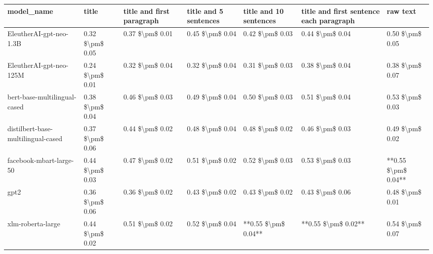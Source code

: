 \begin{tabular}{lllllll}
\toprule
                        model\_name &           title & title and first paragraph & title and 5 sentences & title and 10 sentences & title and first sentence each paragraph &            raw text \\
\midrule
           EleutherAI-gpt-neo-1.3B & 0.32 \$\textbackslash pm\$ 0.05 &           0.37 \$\textbackslash pm\$ 0.01 &       0.45 \$\textbackslash pm\$ 0.04 &        0.42 \$\textbackslash pm\$ 0.03 &                         0.44 \$\textbackslash pm\$ 0.04 &     0.50 \$\textbackslash pm\$ 0.05 \\
           EleutherAI-gpt-neo-125M & 0.24 \$\textbackslash pm\$ 0.01 &           0.32 \$\textbackslash pm\$ 0.04 &       0.32 \$\textbackslash pm\$ 0.04 &        0.31 \$\textbackslash pm\$ 0.03 &                         0.38 \$\textbackslash pm\$ 0.04 &     0.38 \$\textbackslash pm\$ 0.07 \\
      bert-base-multilingual-cased & 0.38 \$\textbackslash pm\$ 0.04 &           0.46 \$\textbackslash pm\$ 0.03 &       0.49 \$\textbackslash pm\$ 0.04 &        0.50 \$\textbackslash pm\$ 0.03 &                         0.51 \$\textbackslash pm\$ 0.04 &     0.53 \$\textbackslash pm\$ 0.03 \\
distilbert-base-multilingual-cased & 0.37 \$\textbackslash pm\$ 0.06 &           0.44 \$\textbackslash pm\$ 0.02 &       0.48 \$\textbackslash pm\$ 0.04 &        0.48 \$\textbackslash pm\$ 0.02 &                         0.46 \$\textbackslash pm\$ 0.03 &     0.49 \$\textbackslash pm\$ 0.02 \\
           facebook-mbart-large-50 & 0.44 \$\textbackslash pm\$ 0.03 &           0.47 \$\textbackslash pm\$ 0.02 &       0.51 \$\textbackslash pm\$ 0.02 &        0.52 \$\textbackslash pm\$ 0.03 &                         0.53 \$\textbackslash pm\$ 0.03 & **0.55 \$\textbackslash pm\$ 0.04** \\
                              gpt2 & 0.36 \$\textbackslash pm\$ 0.06 &           0.36 \$\textbackslash pm\$ 0.02 &       0.43 \$\textbackslash pm\$ 0.02 &        0.43 \$\textbackslash pm\$ 0.02 &                         0.43 \$\textbackslash pm\$ 0.06 &     0.48 \$\textbackslash pm\$ 0.01 \\
                 xlm-roberta-large & 0.44 \$\textbackslash pm\$ 0.02 &           0.51 \$\textbackslash pm\$ 0.02 &       0.52 \$\textbackslash pm\$ 0.04 &    **0.55 \$\textbackslash pm\$ 0.04** &                     **0.55 \$\textbackslash pm\$ 0.02** &     0.54 \$\textbackslash pm\$ 0.07 \\
\bottomrule
\end{tabular}

